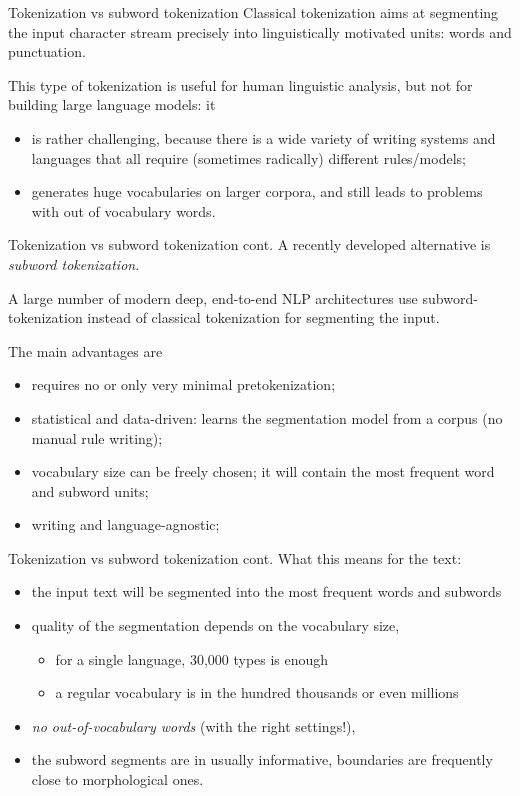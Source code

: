 \documentclass[style=upen, size=14pt]{powerdot}
\theoremstyle{definition}
\begin{document}
\begin{slide}[toc=Subword tokenization]{Tokenization vs subword tokenization}
  Classical tokenization aims at segmenting the input character stream precisely
  into linguistically motivated units: words and punctuation.

  This type of
  tokenization is useful for human linguistic analysis, but not for building
  large language models: it

  \begin{itemize}
  \item is rather challenging, because there is a wide variety of writing systems
    and languages that all require (sometimes radically) different rules/models;
  \item generates huge vocabularies on larger corpora, and still leads to
    problems with out of vocabulary words.
  \end{itemize}
\end{slide}

\begin{slide}[toc=]{Tokenization vs subword tokenization cont.}
  A recently developed alternative is \emph{subword tokenization}.

  A large number of modern deep, end-to-end NLP architectures use
  subword-tokenization instead of classical tokenization for segmenting the
  input.\bigskip

  The main advantages are
  \begin{itemize}
  \item requires no or only very minimal pretokenization;
  \item statistical and data-driven: learns the segmentation model from a corpus
        (no manual rule writing);
  \item vocabulary size can be freely chosen; it will contain the most frequent
        word and subword units;
  \item writing and language-agnostic;
  \end{itemize}
\end{slide}

\begin{slide}[toc=]{Tokenization vs subword tokenization cont.}
  What this means for the text:
  \begin{itemize}
  \item the input text will be segmented into the most frequent words and
        subwords
  \item quality of the segmentation depends on the vocabulary size,
      \begin{itemize}
      \item for a single language, 30,000 types is enough
      \item a regular vocabulary is in the hundred thousands or even millions
      \end{itemize}
  \item \textit{no out-of-vocabulary words} (with the right settings!),
  \item the subword segments are in usually informative, boundaries are
        frequently close to morphological ones.
  \end{itemize}
\end{slide}
\end{document}

